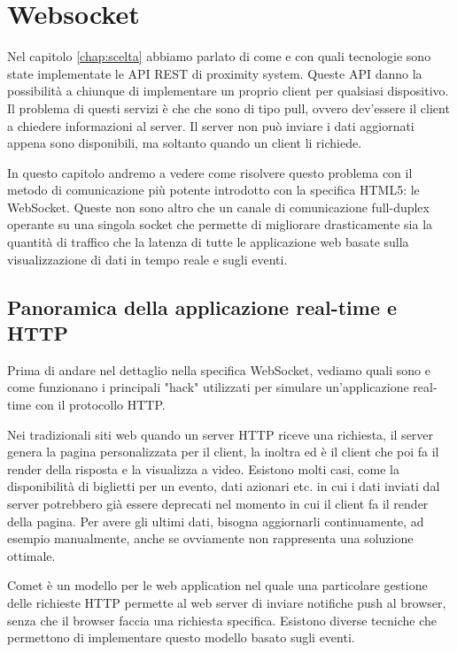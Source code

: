 \chapter{Websocket}
\label{chap:websocket}
\nocite{html5}
Nel capitolo \ref{chap:scelta} abbiamo parlato di come e con quali tecnologie sono state implementate le API REST di proximity system.  
Queste API danno la possibilità a chiunque di implementare un proprio client per qualsiasi dispositivo. 
Il problema di questi servizi è che che sono di tipo pull, ovvero dev'essere il client a chiedere informazioni al server. 
Il server non può inviare i dati aggiornati appena sono disponibili,
ma soltanto quando un client li richiede.

In questo capitolo andremo a vedere come risolvere questo problema con il metodo di comunicazione più potente introdotto con la specifica HTML5: le WebSocket.
Queste non sono altro che un canale di comunicazione full-duplex operante su una singola socket che permette di migliorare drasticamente sia la quantità di traffico che la latenza di tutte le applicazione web basate sulla visualizzazione di dati in tempo reale e sugli eventi.
  
\section{Panoramica della applicazione real-time e HTTP}
\label{sec:real-time}
Prima di andare nel dettaglio nella specifica WebSocket, vediamo quali sono e come funzionano i principali "hack" utilizzati per simulare un'applicazione real-time con il protocollo HTTP.

Nei tradizionali siti web quando un server HTTP riceve una richiesta, il server genera la pagina personalizzata per il client, la inoltra ed è il client che poi fa il render della risposta e la visualizza a video.
Esistono molti casi, come la disponibilità di biglietti per un evento, dati azionari etc. in cui i dati inviati dal server potrebbero già essere deprecati nel momento in cui il client fa il render della pagina. 
Per avere gli ultimi dati, bisogna aggiornarli continuamente, ad esempio manualmente, anche se ovviamente non rappresenta una soluzione ottimale.

Comet è un modello per le web application nel quale una particolare gestione 
delle richieste HTTP permette al web server di inviare notifiche push al browser, senza che il browser faccia una richiesta specifica.
Esistono diverse tecniche che permettono di implementare questo modello basato sugli eventi. 

